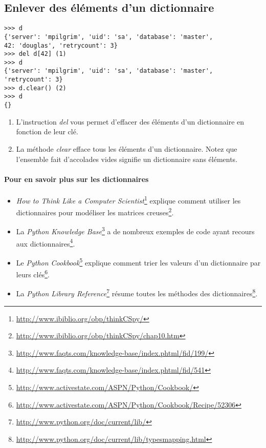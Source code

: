 \subsection{Enlever des éléments d'un dictionnaire}

\begin{example}
\begin{lstlisting}
>>> d
{'server': 'mpilgrim', 'uid': 'sa', 'database': 'master',
42: 'douglas', 'retrycount': 3}
>>> del d[42] (1)
>>> d
{'server': 'mpilgrim', 'uid': 'sa', 'database': 'master', 'retrycount': 3}
>>> d.clear() (2)
>>> d
{}
\end{lstlisting}
\end{example}

\begin{enumerate}
\item{L'instruction \emph{del} vous permet d'effacer des éléments d'un dictionnaire en fonction de leur clé.}
\item{La méthode \emph{clear} efface tous les éléments d'un dictionnaire. Notez que l'ensemble fait d'accolades vides signifie un dictionnaire sans éléments.}
\end{enumerate}

\paragraph{Pour en savoir plus sur les dictionnaires}
\begin{itemize}
\item{\emph{How to Think Like a Computer Scientist}\footnote{\url{http://www.ibiblio.org/obp/thinkCSpy/}} explique comment utiliser les dictionnaires pour modéliser les matrices creuses\footnote{\url{http://www.ibiblio.org/obp/thinkCSpy/chap10.htm}}.}
\item{La \emph{Python Knowledge Base}\footnote{\url{http://www.faqts.com/knowledge-base/index.phtml/fid/199/}} a de nombreux exemples de code ayant recours aux dictionnaires\footnote{\url{http://www.faqts.com/knowledge-base/index.phtml/fid/541}}.}
\item{Le \emph{Python Cookbook}\footnote{\url{http://www.activestate.com/ASPN/Python/Cookbook/}} explique comment trier les valeurs d'un dictionnaire par leurs clés\footnote{\url{http://www.activestate.com/ASPN/Python/Cookbook/Recipe/52306}}.}
\item{La \emph{Python Library Reference}\footnote{\url{http://www.python.org/doc/current/lib/}} résume toutes les méthodes des dictionnaires\footnote{\url{http://www.python.org/doc/current/lib/typesmapping.html}}.}
\end{itemize}

